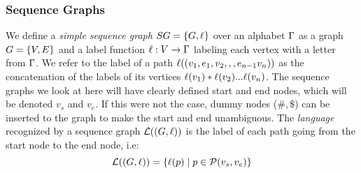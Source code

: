 \subsubsection{Sequence Graphs}
We define a \emph{simple sequence graph} $SG = \left\{G, \ell\right\}$ over an alphabet $\Gamma$ as a graph $G=\left\{V, E\right\}$ and a label function $\ell: V \rightarrow \Gamma$ labeling each vertex with a letter from $\Gamma$.
We refer to the label of a path $\ell((v_1, e_1, v_2,,,e_{n-1}v_n))$ as the concatenation of the labels of its vertices $\ell(v_1)*\ell(v_2) ... \ell(v_n)$.
The sequence graphs we look at here will have clearly defined start and end nodes, which will be denoted $v_s$ and $v_e$. If this were not the case, dummy nodes ($\#, \$$) can be inserted to the graph to make the start and end unambiguous.
The \emph{language} recognized by a sequence graph $\mathcal{L}((G, \ell))$ is the label of each path going from the start node to the end node, i.e:
\[
  \mathcal{L}((G, \ell)) = \left\{ \ell(p) \mid p \in \mathcal{P}(v_s, v_e)\right\}
\]

